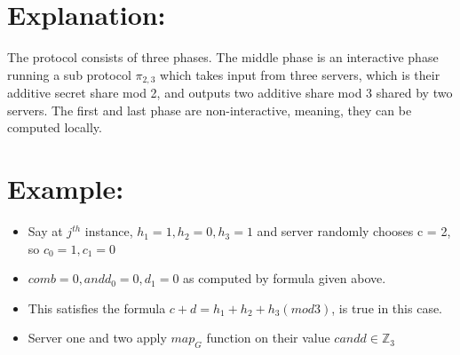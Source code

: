 \documentclass[11pt]{article}
\begin{document}
\section{Explanation:}

The protocol consists of three phases. The middle phase is an interactive phase running a sub protocol $\pi_{2,3}$ which takes input from three servers, which is their additive secret share mod 2, and outputs two additive share mod 3 shared by two servers. The first and last phase are non-interactive, meaning, they can be computed locally. 


\section{Example:}

\begin{itemize}
	\item Say at $j^{th}$ instance, $h_{1} = 1, h_{2} = 0, h_{3} = 1$ and server randomly chooses c = 2, so $c_{0} = 1, c_{1} = 0$
	\item $comb = 0, and d_{0} = 0, d_{1} = 0$ as computed by formula given above. 
	\item This satisfies the formula $c + d = h_{1} + h_{2} + h_{3} (mod 3)$, is true in this case.
	\item Server one and two apply $map_{G}$ function on their value $c and d \in \mathbb{Z}_3$
	
\end{itemize}
\end{document}
